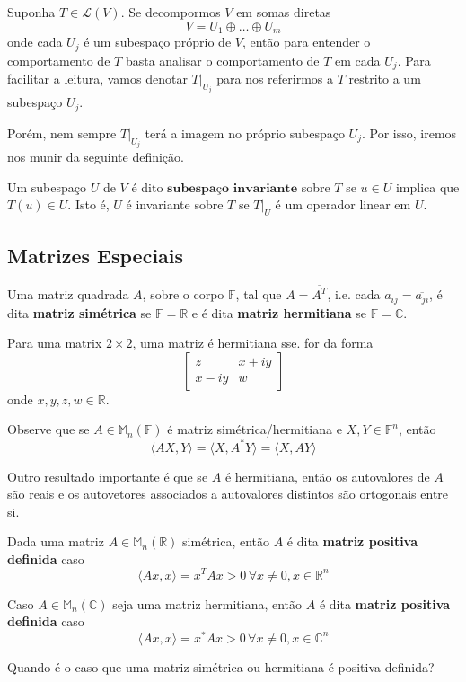 \documentclass[12pt,a4paper]{article}
\begin{document}
Suponha $T \in \mathcal{L}(V)$. Se decompormos $V$ em somas diretas
\[
V = U_1 \oplus \ldots \oplus U_m
\]
onde cada $U_j$ é um subespaço próprio de $V$, então para entender o comportamento de $T$ basta analisar o comportamento de $T$ em cada $U_j$. Para facilitar a leitura, vamos denotar $T|_{U_j}$ para nos referirmos a $T$ restrito a um subespaço $U_j$.

Porém, nem sempre $T|_{U_j}$ terá a imagem no próprio subespaço ${U_j}$. Por isso, iremos nos munir da seguinte definição.

Um subespaço $U$ de $V$ é dito $\textbf{subespaço invariante}$ sobre $T$ se $u \in U$ implica que $T(u) \in U$. Isto é, $U$ é invariante sobre $T$ se $T|_U$ é um operador linear em $U$.

\subsection{Matrizes Especiais}

Uma matriz quadrada $A$, sobre o corpo $\mathbb{F}$, tal que $A = \overline{A^T}$, i.e. cada $a_{ij}= \overline{a_{ji}}$, é dita \textbf{matriz simétrica} se $\mathbb{F} = \mathbb{R}$ e é dita \textbf{matriz hermitiana} se $\mathbb{F} = \mathbb{C}$.

Para uma matrix $2 \times 2$, uma matriz é hermitiana sse. for da forma
$$
\begin{bmatrix}
	z & x+iy \\
	x-iy & w
\end{bmatrix}
$$
onde $x, y, z, w \in \mathbb{R}$.

Observe que se $A \in \mathbb{M}_n(\mathbb{F})$ é matriz simétrica/hermitiana e $X,Y \in \mathbb{F}^n$, então 
\[
\langle AX, Y \rangle = \langle X, A^{\ast} Y \rangle = \langle X, A Y \rangle
\]

Outro resultado importante é que se $A$ é hermitiana, então os autovalores de $A$ são reais e os autovetores associados a autovalores distintos são ortogonais entre si.

Dada uma matriz $A \in \mathbb{M}_n(\mathbb{R})$ simétrica, então $A$ é dita \textbf{matriz positiva definida} caso
\[
\langle Ax, x \rangle = x^T A x > 0 \, \forall x \neq 0, x \in \mathbb{R}^n
\]

Caso $A \in \mathbb{M}_n(\mathbb{C})$ seja uma matriz hermitiana, então $A$ é dita \textbf{matriz positiva definida} caso
\[
\langle Ax, x \rangle = x^{\ast} A x > 0 \, \forall x \neq 0, x \in \mathbb{C}^n
\]

Quando é o caso que uma matriz simétrica ou hermitiana é positiva definida? 
\end{document}
